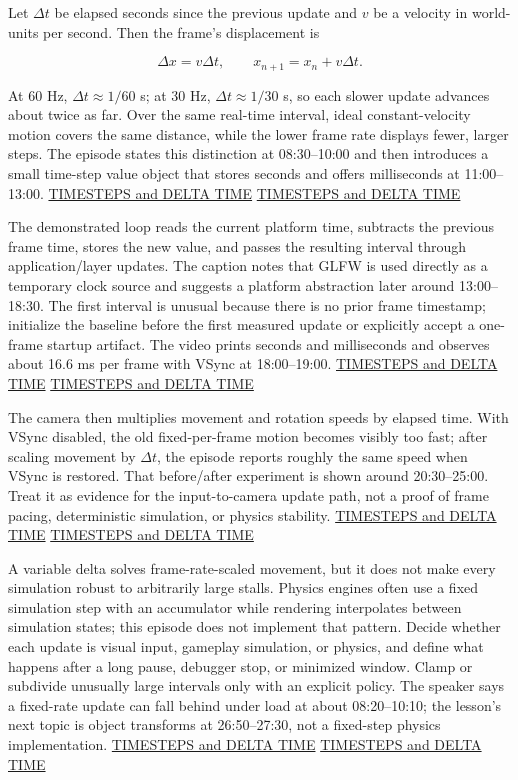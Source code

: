 Let \(\Delta t\) be elapsed seconds since the previous update and \(v\) be a velocity in world-units per second. Then the frame's displacement is

\[\Delta x=v\Delta t, \qquad x_{n+1}=x_n+v\Delta t.\]

At 60 Hz, \(\Delta t\approx 1/60\) s; at 30 Hz, \(\Delta t\approx 1/30\) s, so each slower update advances about twice as far. Over the same real-time interval, ideal constant-velocity motion covers the same distance, while the lower frame rate displays fewer, larger steps. The episode states this distinction at 08:30--10:00 and then introduces a small time-step value object that stores seconds and offers milliseconds at 11:00--13:00. \href{https://www.youtube.com/watch?v=pctGOMDW-HQ&t=510s}{TIMESTEPS and DELTA TIME} \href{https://www.youtube.com/watch?v=pctGOMDW-HQ&t=660s}{TIMESTEPS and DELTA TIME}

The demonstrated loop reads the current platform time, subtracts the previous frame time, stores the new value, and passes the resulting interval through application/layer updates. The caption notes that GLFW is used directly as a temporary clock source and suggests a platform abstraction later around 13:00--18:30. The first interval is unusual because there is no prior frame timestamp; initialize the baseline before the first measured update or explicitly accept a one-frame startup artifact. The video prints seconds and milliseconds and observes about 16.6 ms per frame with VSync at 18:00--19:00. \href{https://www.youtube.com/watch?v=pctGOMDW-HQ&t=780s}{TIMESTEPS and DELTA TIME} \href{https://www.youtube.com/watch?v=pctGOMDW-HQ&t=1080s}{TIMESTEPS and DELTA TIME}

The camera then multiplies movement and rotation speeds by elapsed time. With VSync disabled, the old fixed-per-frame motion becomes visibly too fast; after scaling movement by \(\Delta t\), the episode reports roughly the same speed when VSync is restored. That before/after experiment is shown around 20:30--25:00. Treat it as evidence for the input-to-camera update path, not a proof of frame pacing, deterministic simulation, or physics stability. \href{https://www.youtube.com/watch?v=pctGOMDW-HQ&t=1230s}{TIMESTEPS and DELTA TIME} \href{https://www.youtube.com/watch?v=pctGOMDW-HQ&t=1350s}{TIMESTEPS and DELTA TIME}

A variable delta solves frame-rate-scaled movement, but it does not make every simulation robust to arbitrarily large stalls. Physics engines often use a fixed simulation step with an accumulator while rendering interpolates between simulation states; this episode does not implement that pattern. Decide whether each update is visual input, gameplay simulation, or physics, and define what happens after a long pause, debugger stop, or minimized window. Clamp or subdivide unusually large intervals only with an explicit policy. The speaker says a fixed-rate update can fall behind under load at about 08:20--10:10; the lesson's next topic is object transforms at 26:50--27:30, not a fixed-step physics implementation. \href{https://www.youtube.com/watch?v=pctGOMDW-HQ&t=500s}{TIMESTEPS and DELTA TIME} \href{https://www.youtube.com/watch?v=pctGOMDW-HQ&t=1610s}{TIMESTEPS and DELTA TIME}

